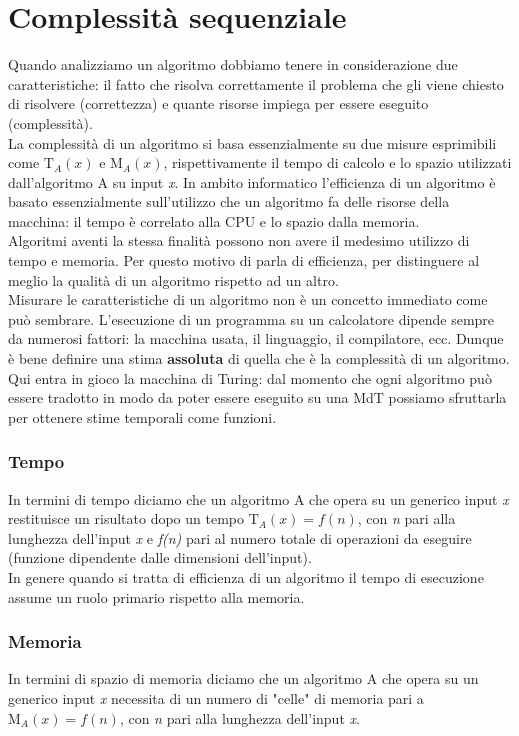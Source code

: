 \section{Complessità sequenziale}
Quando analizziamo un algoritmo dobbiamo tenere in considerazione due caratteristiche: il fatto che risolva correttamente il problema che gli viene chiesto di risolvere (correttezza) e quante risorse impiega per essere eseguito (complessità).\\
La complessità di un algoritmo si basa essenzialmente su due misure esprimibili come $\mathrm{T}_{A}(x)$ e $\mathrm{M}_{A}(x)$, rispettivamente il tempo di calcolo e lo spazio utilizzati dall'algoritmo A su input \textit{x}. In ambito informatico l'efficienza di un algoritmo è basato essenzialmente sull'utilizzo che un algoritmo fa delle risorse della macchina: il tempo è correlato alla CPU e lo spazio dalla memoria.\\
Algoritmi aventi la stessa finalità possono non avere il medesimo utilizzo di tempo e memoria. Per questo motivo di parla di efficienza, per distinguere al meglio la qualità di un algoritmo rispetto ad un altro.\\
Misurare le caratteristiche di un algoritmo non è un concetto immediato come può sembrare. L'esecuzione di un programma su un calcolatore dipende sempre da numerosi fattori: la macchina usata, il linguaggio, il compilatore, ecc. Dunque è bene definire una stima \textbf{assoluta} di quella che è la complessità di un algoritmo.\\
Qui entra in gioco la macchina di Turing: dal momento che ogni algoritmo può essere tradotto in modo da poter essere eseguito su una MdT possiamo sfruttarla per ottenere stime temporali come funzioni.
\subsubsection{Tempo}
In termini di tempo diciamo che un algoritmo A che opera su un generico input \textit{x} restituisce un risultato dopo un tempo $\mathrm{T}_{A}(x) = f(n)$, con \textit{n} pari alla lunghezza dell'input \textit{x} e \textit{f(n)} pari al numero totale di operazioni da eseguire (funzione dipendente dalle dimensioni dell'input).\\
In genere quando si tratta di efficienza di un algoritmo il tempo di esecuzione assume un ruolo primario rispetto alla memoria.
\subsubsection{Memoria}
In termini di spazio di memoria diciamo che un algoritmo A che opera su un generico input \textit{x} necessita di un numero di "celle" di memoria pari a $\mathrm{M}_{A}(x) = f(n)$, con \textit{n} pari alla lunghezza dell'input \textit{x}.

